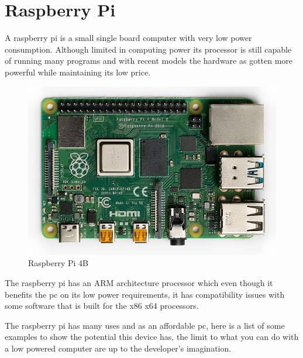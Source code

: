 \section{Raspberry Pi}\label{sec:chap3_rasp}
A raspberry pi is a small single board computer with very low power consumption. Although limited in computing power its processor is still capable of running many programs and with recent models the hardware as gotten more powerful while maintaining its low price.\\

\begin{center}
	\begin{figure}[h!]
		\centering
		\includegraphics[scale=0.32]{./images/3-rasp-4}
		\caption{Raspberry Pi 4B}
		\label{rasp}
	\end{figure}
\end{center}

The raspberry pi has an ARM architecture processor which even though it benefits the pc on its low power requirements, it has compatibility issues with some software that is built for the x86 x64 processors.

The raspberry pi has many uses and as an affordable pc, here is a list of some examples to show the potential this device has, the limit to what you can do with a low powered computer are up to the developer’s imagination.

